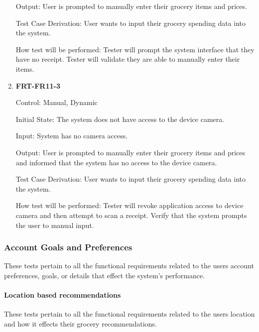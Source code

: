 \documentclass[12pt, titlepage]{article}
\begin{document}
\begin{enumerate}
Output: User is prompted to manually enter their grocery items and prices.

Test Case Derivation: User wants to input their grocery spending data into the system.
          
How test will be performed: Tester will prompt the system interface that they have no receipt. Tester will validate they are able to manually enter their items.

\item{\textbf{FRT-FR11-3}}

Control: Manual, Dynamic
          
Initial State: The system does not have access to the device camera.

Input: System has no camera access.
          
Output: User is prompted to manually enter their grocery items and prices and informed that the system has no access to the device camera.

Test Case Derivation: User wants to input their grocery spending data into the system.
          
How test will be performed: Tester will revoke application access to device camera and then attempt to scan a receipt. Verify that the system prompts the user to manual input.

\end{enumerate}

\subsubsection{Account Goals and Preferences}

These tests pertain to all the functional requirements related to the users account preferences, goals, or details that effect the system's performance.

\paragraph{Location based recommendations}

These tests pertain to all the functional requirements related to the users location and how it effects their grocery recommendations.
\end{document}
